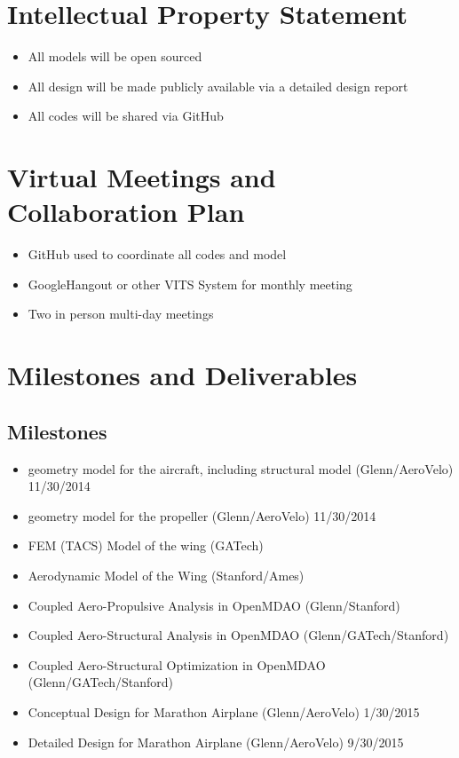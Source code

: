 \documentclass[]{aiaa-tc}
\begin{document}
  
\section{Intellectual Property Statement}
    \begin{itemize}
        \item All models will be open sourced
        \item All design will be made publicly available via a detailed design report
        \item All codes will be shared via GitHub
    \end{itemize}

\section{Virtual Meetings and Collaboration Plan}
    \begin{itemize}
        \item GitHub used to coordinate all codes and model 
        \item GoogleHangout or other VITS System for monthly meeting
        \item Two in person multi-day meetings
    \end{itemize}

\section{Milestones and Deliverables}
    \subsection{Milestones}
        \begin{itemize}
            \item geometry model for the aircraft, including structural model (Glenn/AeroVelo) 11/30/2014
            \item geometry model for the propeller (Glenn/AeroVelo) 11/30/2014
            \item FEM (TACS) Model of the wing (GATech) 
            \item Aerodynamic Model of the Wing (Stanford/Ames)
            \item Coupled Aero-Propulsive Analysis in OpenMDAO (Glenn/Stanford)
            \item Coupled Aero-Structural Analysis in OpenMDAO (Glenn/GATech/Stanford) 
            \item Coupled Aero-Structural Optimization in OpenMDAO (Glenn/GATech/Stanford)
            \item Conceptual Design for Marathon Airplane (Glenn/AeroVelo) 1/30/2015
            \item Detailed Design for Marathon Airplane (Glenn/AeroVelo) 9/30/2015
        \end{itemize}
\end{document}
